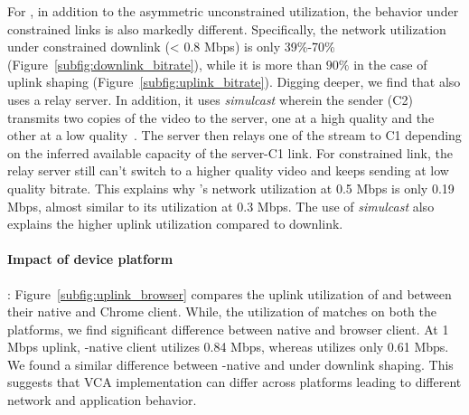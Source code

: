 For \meet, in addition to the asymmetric unconstrained utilization, the behavior under constrained links is also markedly different. Specifically, the network utilization under constrained downlink (< 0.8 Mbps) is only 39\%-70\% (Figure~\ref{subfig:downlink_bitrate}), while it is more than $90\%$ in the case of uplink shaping (Figure~\ref{subfig:uplink_bitrate}). Digging deeper, we find that \meet also uses a relay server. In addition, it uses \textit{simulcast} wherein the sender (C2) transmits two copies of the video to the server, one at a high quality and the other at a low quality~\cite{nistico2020comparative}. The server then relays one of the stream to C1 depending on the inferred available capacity of the server-C1 link. For constrained link, the relay server still can't switch to a higher quality video and keeps sending at low quality bitrate. This explains why \meet's network utilization at 0.5 Mbps is only 0.19 Mbps, almost similar to its utilization at 0.3 Mbps.  The use of \textit{simulcast} also explains the higher uplink utilization compared to downlink. %



\paragraph{Impact of device platform}: Figure~\ref{subfig:uplink_browser} compares the uplink utilization of \zoom and \teams between their native and Chrome client. While, the utilization of \zoom matches on both the platforms, we find significant difference between \teams native and browser client. At 1 Mbps uplink, \teams-native client utilizes 0.84 Mbps, whereas \teamsbrowser utilizes only 0.61 Mbps. We found a similar difference between \teams-native and \teamsbrowser under downlink shaping. This suggests that VCA implementation can differ across platforms leading to different network and application behavior. 



